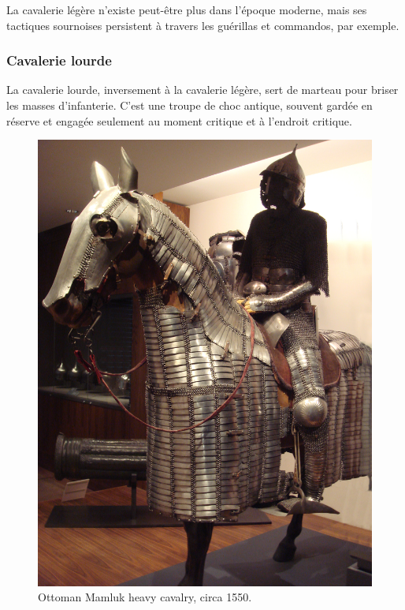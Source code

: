 \documentclass{article}
\begin{document}
La cavalerie légère n'existe peut-être plus dans l'époque moderne, mais ses tactiques sournoises persistent à travers les guérillas et commandos, par exemple.


\subsubsection{Cavalerie lourde}
La cavalerie lourde, inversement à la cavalerie légère, sert de marteau pour briser les masses d'infanterie. C'est une \og{}troupe de choc\fg{} antique, souvent gardée en réserve et engagée seulement au moment critique et à l'endroit critique.
\begin{center}
\begin{figure}[H]
\hfill
\begin{minipage}[H]{0.4\linewidth}
	\centering
	\includegraphics[width=\linewidth]{../ressources/Ottoman_Mamluk_horseman}
	\caption{Ottoman Mamluk heavy cavalry, circa 1550. \cite{heavy_cavalry}}
\end{minipage}

\end{figure}
\end{center}
\end{document}
